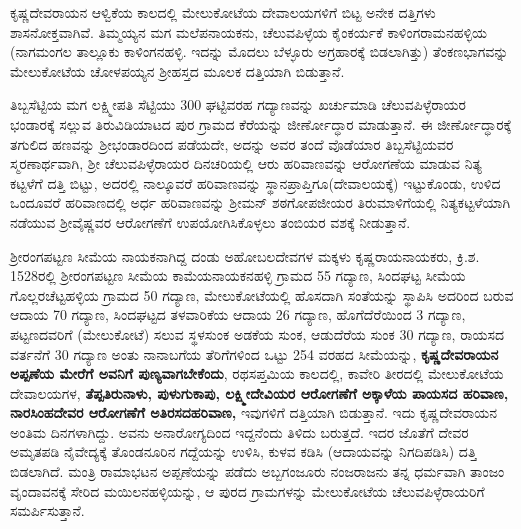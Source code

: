 ಕೃಷ್ಣದೇವರಾಯನ ಆಳ್ವಿಕೆಯ ಕಾಲದಲ್ಲಿ ಮೇಲುಕೋಟೆಯ ದೇವಾಲಯಗಳಿಗೆ ಬಿಟ್ಟ ಅನೇಕ ದತ್ತಿಗಳು ಶಾಸನೋಕ್ತ\-ವಾಗಿವೆ. ತಿಮ್ಮಯ್ಯನ ಮಗ ಮಲೆಪನಾಯಕನು, ಚೆಲುವಪಿಳ್ಳೆಯ ಕೈಂಕರ್ಯಕೆ ಕಾಳಿಂಗರಾಮನಹಳ್ಳಿಯ (ನಾಗಮಂಗಲ ತಾಲ್ಲೂಕು ಕಾಳಿಂಗನಹಳ್ಳಿ. ಇದನ್ನು ಮೊದಲು ಬೆಳ್ಳೂರು ಅಗ್ರಹಾರಕ್ಕೆ ಬಿಡಲಾಗಿತ್ತು) ತೆಂಕಣಭಾಗವನ್ನು ಮೇಲುಕೋಟೆಯ ಚೋಳಪಯ್ಯನ ಶ‍್ರೀಹಸ್ತದ ಮೂಲಕ ದತ್ತಿಯಾಗಿ ಬಿಡುತ್ತಾನೆ.

ತಿಬ್ಬಸೆಟ್ಟಿಯ ಮಗ ಲಕ್ಷ್ಮೀಪತಿ ಸೆಟ್ಟಿಯು 300 ಘಟ್ಟಿವರಹ ಗದ್ಯಾಣವನ್ನು ಖರ್ಚುಮಾಡಿ ಚೆಲುವಪಿಳ್ಳೆರಾಯರ ಭಂಡಾರಕ್ಕೆ ಸಲ್ಲುವ ತಿರುವಿಡಿಯಾಟದ ಪುರ ಗ್ರಾಮದ ಕೆರೆಯನ್ನು ಜೀರ್ಣೋದ್ಧಾರ ಮಾಡುತ್ತಾನೆ. ಈ ಜೀರ್ಣೋದ್ಧಾರಕ್ಕೆ ತಗುಲಿದ ಹಣವನ್ನು ಶ‍್ರೀಭಂಡಾರದಿಂದ ಪಡೆಯದೇ, ಅದನ್ನು ಅವರ ತಂದೆ ವೊಡೆಯಾರ ತಿಬ್ಬಸೆಟ್ಟಿಯವರ ಸ್ಮರಣಾರ್ಥವಾಗಿ, ಶ‍್ರೀ ಚೆಲುವಪಿಳ್ಳೆರಾಯರ ದಿನಚರಿಯಲ್ಲಿ ಆರು ಹರಿವಾಣವನ್ನು ಆರೋಗಣೆಯ ಮಾಡುವ ನಿತ್ಯ ಕಟ್ಟಳೆಗೆ ದತ್ತಿ ಬಿಟ್ಟು, ಅದರಲ್ಲಿ ನಾಲ್ಕೂವರೆ ಹರಿವಾಣವನ್ನು ಸ್ಥಾನಪ್ರಾಪ್ತಿಗೂ(ದೇವಾಲಯಕ್ಕೆ) ಇಟ್ಟುಕೊಂಡು, ಉಳಿದ ಒಂದೂವರೆ ಹರಿವಾಣದಲ್ಲಿ ಅರ್ಧ ಹರಿವಾಣವನ್ನು ಶ‍್ರೀಮನ್​ ಶಠಗೋಪಜೀಯರ ತಿರುಮಾಳಿಗೆಯಲ್ಲಿ ನಿತ್ಯಕಟ್ಟಳೆಯಾಗಿ ನಡೆಯುವ ಶ‍್ರೀವೈಷ್ಣವರ ಆರೋಗಣೆಗೆ ಉಪಯೋಗಿಸಿಕೊಳ್ಳಲು ತಂಬಿಯರ ವಶಕ್ಕೆ ನೀಡುತ್ತಾನೆ.

ಶ‍್ರೀರಂಗಪಟ್ಟಣ ಸೀಮೆಯ ನಾಯಕನಾಗಿದ್ದ ದಂಡು ಅಹೋಬಲದೇವಗಳ ಮಕ್ಕಳು ಕೃಷ್ಣರಾಯನಾಯಕರು, ಕ್ರಿ.ಶ. 1528ರಲ್ಲಿ ಶ‍್ರೀರಂಗಪಟ್ಟಣ ಸೀಮೆಯ ಕಾಮೆಯನಾಯಕನಹಳ್ಳಿ ಗ್ರಾಮದ 55 ಗದ್ಯಾಣ, ಸಿಂದಘಟ್ಟ ಸೀಮೆಯ ಗೊಲ್ಲರಚೆಟ್ಟಹಳ್ಳಿಯ ಗ್ರಾಮದ 50 ಗದ್ಯಾಣ, ಮೇಲುಕೋಟೆಯಲ್ಲಿ ಹೊಸದಾಗಿ ಸಂತೆಯನ್ನು ಸ್ಥಾಪಿಸಿ ಅದರಿಂದ ಬರುವ ಆದಾಯ 70 ಗದ್ಯಾಣ, ಸಿಂದಘಟ್ಟದ ತಳವಾರಿಕೆಯ ಆದಾಯ 26 ಗದ್ಯಾಣ, ಹೊಗೆದೆರೆಯಿಂದ 3 ಗದ್ಯಾಣ, ಪಟ್ಟಣದವರಿಗೆ (ಮೇಲುಕೋಟೆ) ಸಲುವ ಸ್ಥಳಸುಂಕ ಅಡಕೆಯ ಸುಂಕ, ಆಡುದೆರೆಯ ಸುಂಕ 30 ಗದ್ಯಾಣ, ರಾಯಸದ ವರ್ತನೆಗೆ 30 ಗದ್ಯಾಣ ಅಂತು ನಾನಾಬಗೆಯ ತೆರಿಗೆಗಳಿಂದ ಒಟ್ಟು 254 ವರಹದ ಸೀಮೆಯನ್ನು, \textbf{ಕೃಷ್ಣದೇವರಾಯನ ಅಪ್ಪಣೆಯ ಮೇರೆಗೆ ಅವನಿಗೆ ಪುಣ್ಯವಾಗಬೇಕೆಂದು}, ರಥಸಪ್ತಮಿಯ ಕಾಲದಲ್ಲಿ, ಕಾವೇರಿ ತೀರದಲ್ಲಿ ಮೇಲುಕೋಟೆಯ ದೇವಾಲಯಗಳ, \textbf{ತೆಪ್ಪತಿರುನಾಳು, ಪುಳುಗುಕಾಪು, ಲಕ್ಷ್ಮೀದೇವಿಯರ ಆರೋಗಣೆಗೆ ಅಕ್ಕಾಳೆಯ ಪಾಯಸದ ಹರಿವಾಣ, ನಾರಸಿಂಹದೇವರ ಆರೋಗಣೆಗೆ ಅತಿರಸದಹರಿವಾಣ, } ಇವುಗಳಿಗೆ ದತ್ತಿಯಾಗಿ ಬಿಡುತ್ತಾನೆ. ಇದು ಕೃಷ್ಣದೇವರಾಯನ ಅಂತಿಮ ದಿನಗಳಾಗಿದ್ದು. ಅವನು ಅನಾ\-ರೋಗ್ಯದಿಂದ ಇದ್ದನೆಂದು ತಿಳಿದು ಬರುತ್ತದೆ. ಇದರ ಜೊತೆಗೆ ದೇವರ ಅಮೃತಪಡಿ ನೈವೇದ್ಯಕ್ಕೆ ತೊಂಡನೂರಿನ ಗದ್ದೆಯನ್ನು ಉಳಿಸಿ, ಕುಳವ ಕಡಿಸಿ (ಆದಾಯವನ್ನು ನಿಗದಿಪಡಿಸಿ) ದತ್ತಿ ಬಿಡಲಾಗಿದೆ. ಮಂತ್ರಿ ರಾಮಾಭಟನ ಅಪ್ಪಣೆಯನ್ನು ಪಡೆದು ಅಬ್ಬಗಂಜೂರು ನಂಜರಾಜನು ತನ್ನ ಧರ್ಮವಾಗಿ ತಾಂಜಂ ವೃಂದಾವನಕ್ಕೆ ಸೇರಿದ ಮಯಿಲನಹಳ್ಳಿಯನ್ನು, ಆ ಪುರದ ಗ್ರಾಮಗಳನ್ನು ಮೇಲುಕೋಟೆಯ ಚೆಲುವಪಿಳ್ಳೆರಾಯರಿಗೆ ಸಮರ್ಪಿಸುತ್ತಾನೆ.

